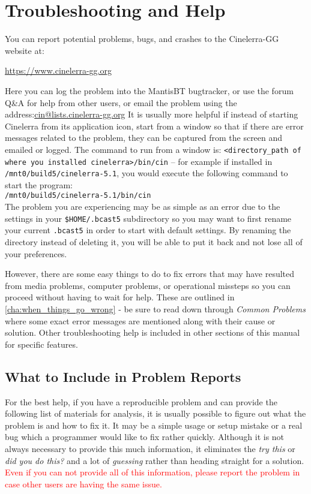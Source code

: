 \chapter{Troubleshooting and Help}%
\label{cha:troubleshooting_help}

You can report potential problems, bugs, and crashes to the Cinelerra-GG website at:

\begin{center}
	\href{https://www.cinelerra-gg.org/}{https://www.cinelerra-gg.org}
\end{center}

Here you can log the problem into the MantisBT bugtracker, or use the forum Q\&A for help from other users, or email the
problem using the address:{\small \href{mailto:cin@lists.cinelerra-gg.org}{cin@lists.cinelerra-gg.org}} It is usually more
helpful if instead of starting Cinelerra from its application icon, start from a window so that if there are error
messages related to the problem, they can be captured from the screen and emailed or logged. The command to run
from a window is: \texttt{<directory\_path of where you installed cinelerra>/bin/cin} -- for example if
installed in \texttt{/mnt0/build5/cinelerra-5.1}, you would execute the following command to start the program:\\
\texttt{/mnt0/build5/cinelerra-5.1/bin/cin} \\
The problem you are experiencing may be as simple as an error due to the settings in your \texttt{\$HOME/.bcast5} subdirectory so you may want to first rename your current \texttt{.bcast5} in order to start with default settings. By renaming the directory instead of deleting it, you will be able to put it back and not lose all of your preferences.

However, there are some easy things to do to fix errors that may have resulted from media problems,
computer problems, or operational missteps so you can proceed without having to wait for help.  These
are outlined in \ref{cha:when_things_go_wrong} - be sure to read down through
\textit{Common Problems} where some exact error messages are mentioned along with their cause or solution.  Other 
troubleshooting help is included in other sections of this manual for specific features.

\section{What to Include in Problem Reports}%
\label{cha:include_in_problem_reports}
For the best help, if you have a reproducible problem and can provide the following list of materials for analysis, it
is usually possible to figure out what the problem is and how to fix it. It may be a simple usage or setup mistake or
a real bug which a programmer would like to fix rather quickly. Although it is not always necessary to provide this
much information, it eliminates the \textit{try this} or \textit{did you do this?} and a lot of \textit{guessing} rather than heading straight for a solution. \textcolor{red}{Even if you can not provide all of this information, please report the problem in case other users are having the same issue.}

